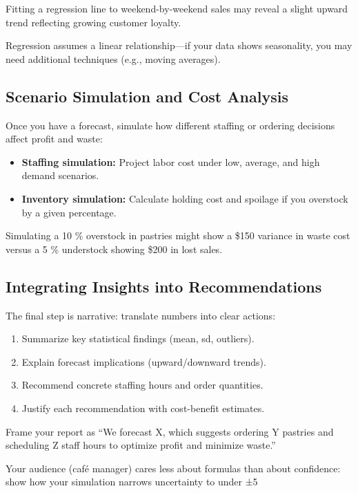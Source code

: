 \begin{Example}
Fitting a regression line to weekend-by-weekend sales may reveal a slight upward trend reflecting growing customer loyalty.
\end{Example}

\begin{Important}
Regression assumes a linear relationship—if your data shows seasonality, you may need additional techniques (e.g., moving averages).
\end{Important}

\subsection{Scenario Simulation and Cost Analysis}
Once you have a forecast, simulate how different staffing or ordering decisions affect profit and waste:

\begin{itemize}
  \item \textbf{Staffing simulation:} Project labor cost under low, average, and high demand scenarios.
  \item \textbf{Inventory simulation:} Calculate holding cost and spoilage if you overstock by a given percentage.
\end{itemize}

\begin{Example}
Simulating a 10 \% overstock in pastries might show a \$150 variance in waste cost versus a 5 \% understock showing \$200 in lost sales.
\end{Example}

\subsection{Integrating Insights into Recommendations}
The final step is narrative: translate numbers into clear actions:

\begin{enumerate}
  \item Summarize key statistical findings (mean, sd, outliers).
  \item Explain forecast implications (upward/downward trends).
  \item Recommend concrete staffing hours and order quantities.
  \item Justify each recommendation with cost-benefit estimates.
\end{enumerate}

\begin{Tip}
Frame your report as “We forecast X, which suggests ordering Y pastries and scheduling Z staff hours to optimize profit and minimize waste.”
\end{Tip}

\begin{Important}
Your audience (café manager) cares less about formulas than about confidence: show how your simulation narrows uncertainty to under ±5 %
\end{Important}


\clearpage
